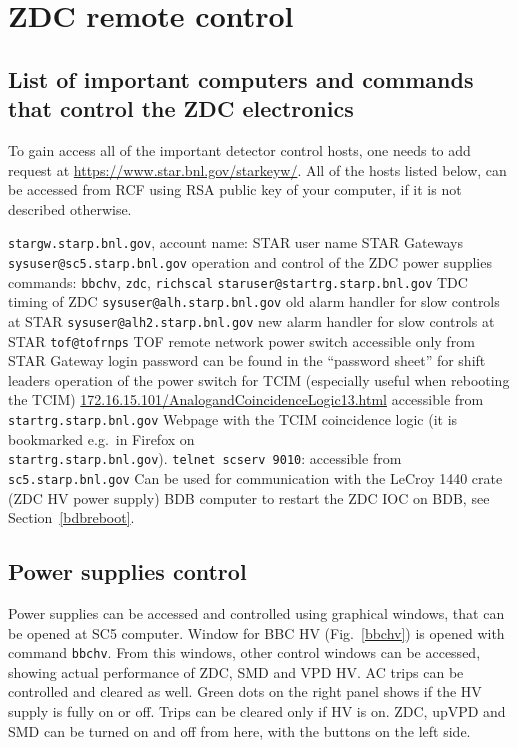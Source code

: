 
\chapter{\label{remote}ZDC remote control}
\section{\label{computers}List of important computers and commands that control the ZDC electronics}

To gain access all of the important detector control hosts, one needs to add request at \url{https://www.star.bnl.gov/starkeyw/}. All of the hosts listed below, can be accessed from RCF using RSA public key of your computer, if it is not described otherwise.
\begin{outline}
 \1 \texttt{stargw.starp.bnl.gov}, account name: STAR user name
   \2 STAR Gateways
 \1 \texttt{sysuser@sc5.starp.bnl.gov} 
   \2 operation and control of the ZDC power supplies
   \2 commands: \texttt{bbchv}, \texttt{zdc}, \texttt{richscal}
 \1 \texttt{staruser@startrg.starp.bnl.gov}
   \2 TDC timing of ZDC
 \1 \texttt{sysuser@alh.starp.bnl.gov} 
   \2 old alarm handler for slow controls at STAR
 \1 \texttt{sysuser@alh2.starp.bnl.gov}
   \2 new alarm handler for slow controls at STAR
 \1 \texttt{tof@tofrnps}
   \2 TOF remote network power switch
   \2 accessible only from STAR Gateway
   \2 login password can be found in the ``password sheet'' for shift leaders
   \2 operation of the power switch for TCIM (especially useful when rebooting the TCIM)
 \1 \url{172.16.15.101/AnalogandCoincidenceLogic13.html}
   \2 accessible from \texttt{startrg.starp.bnl.gov}
   \2 Webpage with the TCIM coincidence logic (it is bookmarked e.g.\ in Firefox on\\
   \texttt{startrg.starp.bnl.gov}).
 \1 \texttt{telnet scserv 9010}: 
   \2 accessible  from \texttt{sc5.starp.bnl.gov}
   \2 Can be used for communication with the LeCroy 1440 crate (ZDC HV power supply)
   \2 BDB computer
   \2 to restart the ZDC IOC on BDB, see Section~\ref{bdbreboot}.
\end{outline}


\section{Power supplies control}
Power supplies can be accessed and controlled using graphical windows, that can be opened at SC5 computer. 
Window for BBC HV (Fig.~\ref{bbchv}) is opened with command \texttt{bbchv}. From this windows, other control windows can be accessed, showing actual performance of ZDC, SMD and VPD HV\@. AC trips can be controlled and cleared as well. Green dots on the right panel shows if the HV supply is fully on or off. Trips can be cleared only if HV is on. ZDC, upVPD and SMD can be turned on and off from here, with the buttons on the left side.

